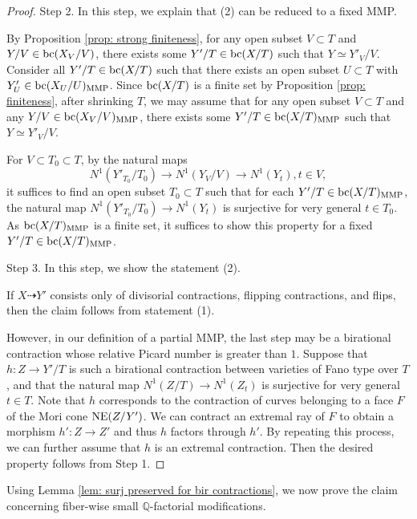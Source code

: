 \documentclass[11pt,oneside,reqno]{amsart}
\numberwithin{equation}{section}
\theoremstyle{definition}
\newcommand{\bc}{{\rm {bc}}}
\newcommand{\NE}{{\rm {NE}}}
\newcommand{\dto}{\dashrightarrow}
\newcommand{\bQ}{\mathbb{Q}}
\begin{document}
\begin{proof}
    Step 2. In this step, we explain that (2) can be reduced to a fixed MMP.
    
    By Proposition \ref{prop: strong finiteness}, for any open subset $V\subset T$ and $Y/V \in \bc(X_V/V)$, there exists some $Y'/T \in \bc(X/T)$ such that $Y \simeq Y'_V/V$. Consider all $Y'/T \in \bc(X/T)$ such that there exists an open subset $U \subset T$ with $Y'_U \in \bc(X_U/U)_{\mathrm{MMP}}$. Since $\bc(X/T)$ is a finite set by Proposition \ref{prop: finiteness}, after shrinking $T$, we may assume that for any open subset $V \subset T$ and any $Y/V \in \bc(X_V/V)_{\mathrm{MMP}}$, there exists some $Y'/T \in \bc(X/T)_{\mathrm{MMP}}$ such that $Y \simeq Y'_V/V$.
    
    
    For $V\subset T_0 \subset T$, by the natural maps 
    \[
    N^1(Y'_{T_0}/T_0) \to N^1(Y_V/V) \to N^1(Y_t), t\in V, 
    \] it suffices to find an open subset $T_0\subset T$ such that for each $Y'/T\in \bc(X/T)_{\rm MMP}$, the natural map $ N^1(Y'_{T_0}/T_0) \to N^1(Y_t)$ is surjective for very general $t\in T_0$. As $\bc(X/T)_{\rm MMP}$ is a finite set, it suffices to show this property for a fixed $Y'/T \in \bc(X/T)_{\rm MMP}$.

Step 3. In this step, we show the statement (2). 

If $X \dto Y'$ consists only of divisorial contractions, flipping contractions, and flips, then the claim follows from statement (1).

However, in our definition of a partial MMP, the last step may be a birational contraction whose relative Picard number is greater than $1$. Suppose that $h\colon Z \to Y'/T$ is such a birational contraction between varieties of Fano type over $T$, and that the natural map $N^1(Z/T)\to N^1(Z_t)$ is surjective for very general $t\in T$. Note that $h$ corresponds to the contraction of curves belonging to a face $F$ of the Mori cone $\NE(Z/Y')$. We can contract an extremal ray of $F$ to obtain a morphism $h': Z \to Z'$ and thus $h$ factors through $h'$. By repeating this process, we can further assume that $h$ is an extremal contraction. Then the desired property follows from Step 1. 
\end{proof}

Using Lemma \ref{lem: surj preserved for bir contractions}, we now prove the claim concerning fiber-wise small $\bQ$-factorial modifications.
\end{document}
